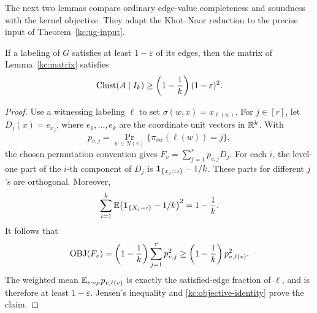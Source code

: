 The next two lemmas compare ordinary edge-value completeness and
soundness with the kernel objective. They adapt the
Khot--Naor reduction \cite[Section~3.3]{KhotNaor} to the precise
input of Theorem~\ref{kc:ug-input}.

\begin{lemma}[Completeness]\label{kc:completeness}
If a labeling of \(G\) satisfies at least \(1-\varepsilon\) of
its edges, then the matrix of Lemma~\ref{kc:matrix} satisfies
\[
 \operatorname{Clust}(A\mid I_k)\ge
       \left(1-\frac1k\right)(1-\varepsilon)^2.
\]
\end{lemma}
\begin{proof}
Use a witnessing labeling \(\ell\) to set
\(\sigma(w,x)=x_{\ell(w)}\).
For \(j\in[r]\), let \(D_j(x)=e_{x_j}\), where
\(e_1,\ldots,e_k\) are the coordinate unit vectors in \(\mathbb R^k\).
With
\[
 p_{v,j}=
 \Pr_{w\in N(v)}\{\pi_{vw}(\ell(w))=j\},
\]
the chosen permutation convention gives
\(F_v=\sum_{j=1}^r p_{v,j}D_j\).
For each \(i\), the level-one part of the \(i\)-th component of
\(D_j\) is \(\mathbf 1_{\{x_j=i\}}-1/k\). These parts for different
\(j\)'s are orthogonal. Moreover,
\[
 \sum_{i=1}^k
 \mathbb E\bigl(\mathbf 1_{\{X_j=i\}}-1/k\bigr)^2=1-\frac1k.
\]
It follows that
\[
 \operatorname{OBJ}(F_v)=
 \left(1-\frac1k\right)\sum_{j=1}^r p_{v,j}^2
 \ge \left(1-\frac1k\right)p_{v,\ell(v)}^2.
\]
The weighted mean \(\mathbb E_{v\sim\mu}p_{v,\ell(v)}\) is exactly
the satisfied-edge fraction of \(\ell\), and is therefore at
least \(1-\varepsilon\). Jensen's inequality and
\eqref{kc:objective-identity} prove the claim.
\end{proof}

